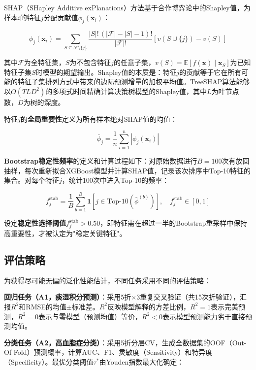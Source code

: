 \documentclass[12pt,a4paper]{ctexart}
\begin{document}
SHAP（SHapley Additive exPlanations）方法基于合作博弈论中的Shapley值，为样本$i$的特征$j$分配贡献值$\phi_j(\mathbf{x}_i)$：

\begin{equation}
\phi_j(\mathbf{x}_i) = \sum_{S \subseteq \mathcal{F} \setminus \{j\}} \frac{|S|!\,(|\mathcal{F}|-|S|-1)!}{|\mathcal{F}|!}\left[v(S \cup \{j\}) - v(S)\right]
\label{eq:shapley}
\end{equation}

其中$\mathcal{F}$为全特征集，$S$为不包含特征$j$的任意子集，$v(S) = \mathbb{E}[f(\mathbf{x}) \mid \mathbf{x}_S]$为已知特征子集$S$时模型的期望输出。Shapley值的本质是：特征$j$的贡献等于它在所有可能的特征子集排列方式中带来的边际预测增量的加权平均值。TreeSHAP算法能够以$O(TLD^2)$的多项式时间精确计算决策树模型的Shapley值，其中$L$为叶节点数，$D$为树的深度。

特征$j$的\textbf{全局重要性}定义为所有样本绝对SHAP值的均值：

\begin{equation}
\bar{\phi}_j = \frac{1}{n}\sum_{i=1}^{n}|\phi_j(\mathbf{x}_i)|
\label{eq:global_shap}
\end{equation}

\textbf{Bootstrap稳定性频率}的定义和计算过程如下：对原始数据进行$B = 100$次有放回抽样，每次重新拟合XGBoost模型并计算SHAP值，记录该次排序中Top-10特征的集合。对每个特征$j$，统计100次中进入Top-10的频率：

\begin{equation}
f_j^{\text{stab}} = \frac{1}{B}\sum_{b=1}^{B}\mathbf{1}\left[j \in \text{Top-10}\left(\bar{\phi}^{(b)}\right)\right], \quad f_j^{\text{stab}} \in [0, 1]
\label{eq:stability}
\end{equation}

设定\textbf{稳定性选择阈值}$f_j^{\text{stab}} > 0.50$，即特征需在超过一半的Bootstrap重采样中保持高重要性，才被认定为"稳定关键特征"。

\subsection{评估策略}

为获得尽可能无偏的泛化性能估计，不同任务采用不同的评估策略：

\textbf{回归任务（A1，痰湿积分预测）}：采用5折$\times$3重复交叉验证（共15次折验证），汇报$R^2$和RMSE的均值$\pm$标准差。$R^2$反映模型解释的方差比例，$R^2 = 1$表示完美预测，$R^2 = 0$表示与零模型（预测均值）等价，$R^2 < 0$表示模型预测能力劣于直接预测均值。

\textbf{分类任务（A2，高血脂症分类）}：采用5折分层CV，生成全数据集的OOF（Out-Of-Fold）预测概率，计算AUC、F1、灵敏度（Sensitivity）和特异度（Specificity）。最优分类阈值$\tau^*$由Youden指数最大化确定：
\end{document}
